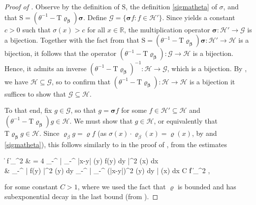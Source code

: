 \documentclass{amsart}
\numberwithin{equation}{section}
\theoremstyle{remark}
\theoremstyle{definition}
\begin{document}
	
	\begin{proof}[Proof of ]
		
		Observe by the definition of $\bm{\mathrm{S}}$, the definition \eqref{sigmatheta} of $\sigma$, and  that $\bm{\mathrm{S}} = (\theta^{-1} - \bm{\mathrm{T} \varrho_{\beta}}) \bm{\sigma}$. Define $\mathcal{G} = \{ \bm{\sigma} f : f \in \mathcal{H}' \}$. Since  yields a constant $c>0$ such that $\sigma(x)>c$ for all $x \in \mathbb{R}$, the multiplication operator $\bm{\sigma} : \mathcal{H}' \rightarrow \mathcal{G}$ is a bijection. Together with the fact from  that $\bm{\mathrm{S}} = (\theta^{-1} - \bm{\mathrm{T} \varrho_{\beta}}) \bm{\sigma}: \mathcal{H}' \rightarrow \mathcal{H}$ is a bijection, it follows that the operator $(\theta^{-1} - \bm{\mathrm{T}} \bm{\varrho_{\beta}}) : \mathcal{G} \rightarrow \mathcal{H}$ is a bijection. Hence, it admits an inverse $(\theta^{-1} - \bm{\mathrm{T} \varrho_{\beta}})^{-1} : \mathcal{H} \rightarrow \mathcal{G}$, which is a bijection. By , we have $\mathcal{H} \subseteq \mathcal{G}$, so to confirm that $(\theta^{-1} - \bm{\mathrm{T} \varrho_{\beta}}) : \mathcal{H} \rightarrow \mathcal{H}$ is a bijection it suffices to show that $\mathcal{G} \subseteq \mathcal{H}$. 
		
		To that end, fix $g \in \mathcal{G}$,  so that $g = \bm{\sigma} f$ for some $f \in \mathcal{H}' \subseteq \mathcal{H}$ and $(\theta^{-1} - \bm{\mathrm{T} \varrho_{\beta}}) g \in \mathcal{H}$. We must show that $g \in \mathcal{H}$, or equivalently that $\bm{\mathrm{T} \varrho_{\beta}} g \in \mathcal{H}$. Since $\varrho_{\beta} g = \varrho f$ (as $\sigma (x) \cdot \varrho_{\beta} (x) = \varrho (x)$, by  and \eqref{sigmatheta}), this follows similarly to in the proof of , from the estimates
		\begin{flalign*}
			\|  f \|_{}^2 & = 4 \displaystyle\int_{-\infty}^{\infty} \bigg| \displaystyle\int_{-\infty}^{\infty} \log |x-y|  \cdot \varrho (y) f(y) dy \bigg|^2 \varrho (x) dx \\
			&  \displaystyle\int_{-\infty}^{\infty} | f(y) |^2 \varrho (y) dy \cdot  \displaystyle\int_{-\infty}^{\infty}  \Bigg| \displaystyle\int_{-\infty}^{\infty} (\log |x-y|)^2  \varrho (y) dy \Bigg| \cdot \varrho (x) dx \le C \cdot \| f \|_{}^2 ,
		\end{flalign*}
	
		\noindent for some constant $C>1$, where we used the fact that $\varrho$ is bounded and has subexponential decay in the last bound (from ).
	\end{proof} 
	
\end{document}
